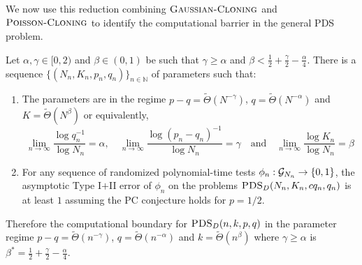 \documentclass[11pt]{article}
\begin{document}
We now use this reduction combining $\textsc{Gaussian-Cloning}$ and $\textsc{Poisson-Cloning}$ to identify the computational barrier in the general PDS problem.

\begin{theorem}
Let $\alpha, \gamma \in [0, 2)$ and $\beta \in (0, 1)$ be such that $\gamma \ge \alpha$ and $\beta < \frac{1}{2} + \frac{\gamma}{2} - \frac{\alpha}{4}$. There is a sequence $\{ (N_n, K_n, p_n, q_n) \}_{n \in \mathbb{N}}$ of parameters such that:
\begin{enumerate}
\item The parameters are in the regime $p - q = \tilde{\Theta}(N^{-\gamma})$, $q = \tilde{\Theta}(N^{-\alpha})$ and $K = \tilde{\Theta}(N^\beta)$ or equivalently,
$$\lim_{n \to \infty} \frac{\log q_n^{-1}}{\log N_n} = \alpha, \quad \lim_{n \to \infty} \frac{\log (p_n - q_n)^{-1}}{\log N_n} = \gamma \quad \text{and} \quad \lim_{n \to \infty} \frac{\log K_n}{\log N_n} = \beta$$
\item For any sequence of randomized polynomial-time tests $\phi_n : \mathcal{G}_{N_n} \to \{0, 1\}$, the asymptotic Type I$+$II error of $\phi_n$ on the problems $\textsc{PDS}_D(N_n, K_n, cq_n, q_n)$ is at least $1$ assuming the PC conjecture holds for $p = 1/2$.
\end{enumerate}
Therefore the computational boundary for $\textsc{PDS}_D(n, k, p, q)$ in the parameter regime $p - q = \tilde{\Theta}(n^{-\gamma})$, $q = \tilde{\Theta}(n^{-\alpha})$ and $k = \tilde{\Theta}(n^\beta)$ where $\gamma \ge \alpha$ is $\beta^* = \frac{1}{2} + \frac{\gamma}{2} - \frac{\alpha}{4}$.
\end{theorem}
\end{document}

